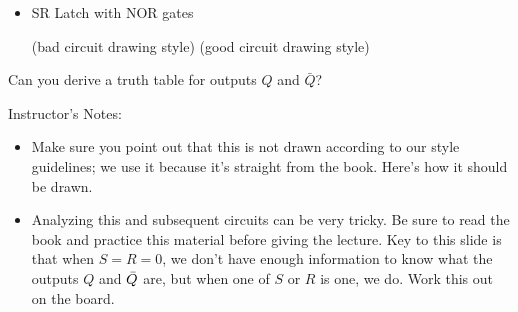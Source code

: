\begin{frame}[fragile]
\begin{itemize}

	\item SR Latch with NOR gates
\begin{multicols}{2}
  (bad circuit drawing style)
\columnbreak
    (good circuit drawing style)
    
\end{multicols}
 \end{itemize}
 \begin{tcolorbox}[enhanced,attach boxed title to top center={yshift=-3mm,yshifttext=-1mm},
  colback=blue!5!white,colframe=blue!75!black,colbacktitle=blue!80!black,
  title=Think About It,fonttitle=\bfseries,
  boxed title style={size=small,colframe=red!50!black} ]         		
	Can you derive a truth table for outputs $Q$ and $\bar{Q}$?
 \end{tcolorbox}

\end{frame}

\BNotes\ifnum{}
\begin{frame}[fragile]
Instructor's Notes:
\begin{itemize}
\item Make sure you point out that this is not drawn according to our
style guidelines; we use it because it's straight from the
book. Here's how it should be drawn.



\item Analyzing this and subsequent circuits can be very tricky.  Be
sure to read the book and practice this material before giving the
lecture. Key to this slide is that when $S=R=0$, we don't have enough
information to know what the outputs $Q$ and $\Bar{Q}$ are, but when
one of $S$ or $R$ is one, we do. Work this out on the board.
\end{itemize}
\end{frame}

